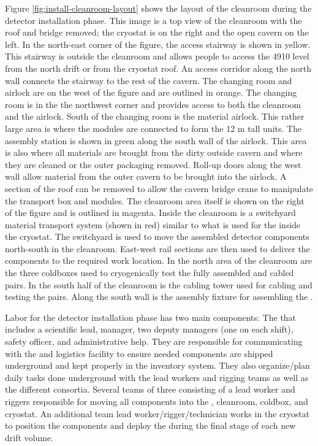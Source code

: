 Figure \ref{fig:install-cleanroom-layout} shows the layout of the cleanroom during the detector installation phase. This image is a top view of the cleanroom with the roof and bridge removed; the cryostat is on the right and the open cavern on the left. In the north-east corner of the figure, the access stairway is shown in yellow. This stairway is outside the cleanroom and allows people to access the 4910 level from the north drift or from the cryostat roof. An access corridor along the north  wall connects the stairway to the rest of the cavern. The changing room and airlock are on the west of the figure and are outlined in orange. The changing room is in the the northwest corner and provides access to both the cleanroom and the airlock. South of the changing room is the material airlock. This rather large area is where the  modules are connected to form the 12 \si{m} tall units. The assembly station is shown in green along the south wall of the airlock. This area is also where all materials are brought from the dirty outside cavern and where they are cleaned or the outer packaging removed. Roll-up doors along the west wall allow material from the outer cavern to be brought into the airlock. A section of the roof can be removed to allow the cavern bridge crane to manipulate the  transport box and modules. The cleanroom area itself is shown on the right of the figure and is outlined in magenta. Inside the cleanroom is a switchyard material transport system (shown in red) similar to what is used for the  inside the cryostat. The switchyard is used to move the assembled detector components north-south in the cleanroom. East-west rail sections are then used to deliver the components to the required work location. In the north area of the cleanroom are the three coldboxes used to cryogenically test the fully assembled and cabled  pairs. In the south half of the cleanroom is the  cabling tower used for cabling and testing the  pairs. Along the south wall is the  assembly fixture for assembling the . 

Labor for the detector installation phase has two main components: 
The  that includes a scientific lead, manager, two deputy managers (one on each shift), safety officer, and administrative help. They are responsible for communicating with the  and logistics facility to ensure needed components are shipped underground and kept properly in the inventory system.  They also organize/plan daily tasks done underground with the lead workers and rigging teams as well as the different consortia.  Several teams of three  consisting of a lead worker and riggers responsible for moving all  components into the ,  cleanroom, coldbox, and cryostat. An additional team lead worker/rigger/technician works in the cryostat to position the  components and deploy the  during the final stage of each new drift volume. 

